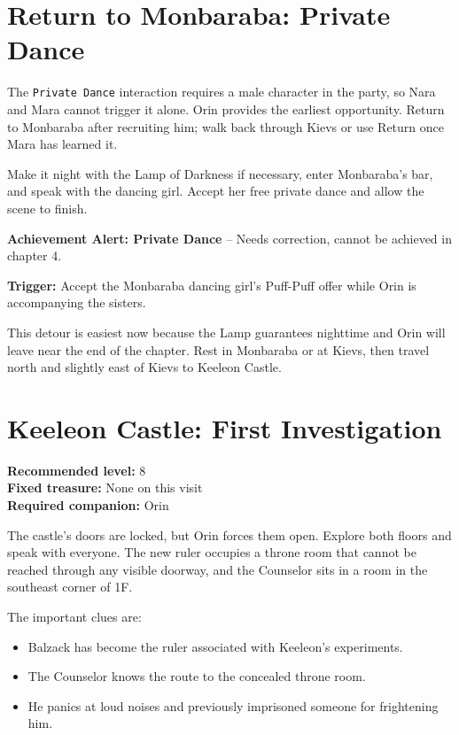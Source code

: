 \documentclass[
  american,
  10pt,
  letterpaper,
  oneside,
  open=any]{scrreprt}
\providecommand{\tightlist}{%
  \setlength{\itemsep}{0pt}\setlength{\parskip}{0pt}}
\begin{document}
\section{Return to Monbaraba: Private
Dance}\label{return-to-monbaraba-private-dance}

The \texttt{Private\ Dance} interaction requires a male character in the
party, so Nara and Mara cannot trigger it alone. Orin provides the
earliest opportunity. Return to Monbaraba after recruiting him; walk
back through Kievs or use Return once Mara has learned it.

Make it night with the Lamp of Darkness if necessary, enter Monbaraba's
bar, and speak with the dancing girl. Accept her free private dance and
allow the scene to finish.

\begin{achievementalert}

\textbf{Achievement Alert: Private Dance} -- Needs correction, cannot be
achieved in chapter 4.

\textbf{Trigger:} Accept the Monbaraba dancing girl's Puff-Puff offer
while Orin is accompanying the sisters.

\end{achievementalert}

This detour is easiest now because the Lamp guarantees nighttime and
Orin will leave near the end of the chapter. Rest in Monbaraba or at
Kievs, then travel north and slightly east of Kievs to Keeleon Castle.

\section{Keeleon Castle: First
Investigation}\label{keeleon-castle-first-investigation}

\textbf{Recommended level:} 8\\
\textbf{Fixed treasure:} None on this visit\\
\textbf{Required companion:} Orin

The castle's doors are locked, but Orin forces them open. Explore both
floors and speak with everyone. The new ruler occupies a throne room
that cannot be reached through any visible doorway, and the Counselor
sits in a room in the southeast corner of 1F.

The important clues are:

\begin{itemize}
\tightlist
\item
  Balzack has become the ruler associated with Keeleon's experiments.
\item
  The Counselor knows the route to the concealed throne room.
\item
  He panics at loud noises and previously imprisoned someone for
  frightening him.
\end{itemize}
\end{document}
